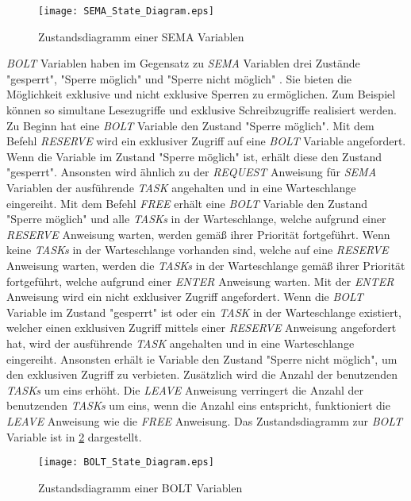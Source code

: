 \begin{figure}[ht]
  \texttt{[image: SEMA\_State\_Diagram.eps]}
  \caption{Zustandsdiagramm einer SEMA Variablen}
  \label{fig:SEMA_StateDiagram}
\end{figure}

\textit{BOLT} Variablen haben im Gegensatz zu \textit{SEMA} Variablen drei Zustände "gesperrt", "Sperre möglich" und "Sperre nicht möglich" \autocite[9--17]{PEARL}. Sie bieten die Möglichkeit exklusive und nicht exklusive Sperren zu ermöglichen. Zum Beispiel können so simultane Lesezugriffe und exklusive Schreibzugriffe realisiert werden. Zu Beginn hat eine \textit{BOLT} Variable den Zustand "Sperre möglich". Mit dem Befehl \textit{RESERVE} wird ein exklusiver Zugriff auf eine \textit{BOLT} Variable angefordert. Wenn die Variable im Zustand "Sperre möglich" ist, erhält diese den Zustand "gesperrt". Ansonsten wird ähnlich zu der \textit{REQUEST} Anweisung für \textit{SEMA} Variablen der ausführende \textit{TASK} angehalten und in eine Warteschlange eingereiht. Mit dem Befehl \textit{FREE} erhält eine \textit{BOLT} Variable den Zustand "Sperre möglich" und alle \textit{TASKs} in der Warteschlange, welche aufgrund einer \textit{RESERVE} Anweisung warten, werden gemäß ihrer Priorität fortgeführt. Wenn keine \textit{TASKs} in der Warteschlange vorhanden sind, welche auf eine \textit{RESERVE} Anweisung warten, werden die \textit{TASKs} in der Warteschlange gemäß ihrer Priorität fortgeführt, welche aufgrund einer \textit{ENTER} Anweisung warten. Mit der \textit{ENTER} Anweisung wird ein nicht exklusiver Zugriff angefordert. Wenn die \textit{BOLT} Variable im Zustand "gesperrt" ist oder ein \textit{TASK} in der Warteschlange existiert, welcher einen exklusiven Zugriff mittels einer \textit{RESERVE} Anweisung angefordert hat, wird der ausführende \textit{TASK} angehalten und in eine Warteschlange eingereiht. Ansonsten erhält ie Variable den Zustand "Sperre nicht möglich", um den exklusiven Zugriff zu verbieten. Zusätzlich wird die Anzahl der benutzenden \textit{TASKs} um eins erhöht. Die \textit{LEAVE} Anweisung verringert die Anzahl der benutzenden \textit{TASKs} um eins, wenn die Anzahl eins entspricht, funktioniert die \textit{LEAVE} Anweisung wie die \textit{FREE} Anweisung. Das Zustandsdiagramm zur \textit{BOLT} Variable ist in \cref{fig:BOLT_StateDiagram} dargestellt.

\begin{figure}[ht]
  \texttt{[image: BOLT\_State\_Diagram.eps]}
  \caption{Zustandsdiagramm einer BOLT Variablen}
  \label{fig:BOLT_StateDiagram}
\end{figure}

